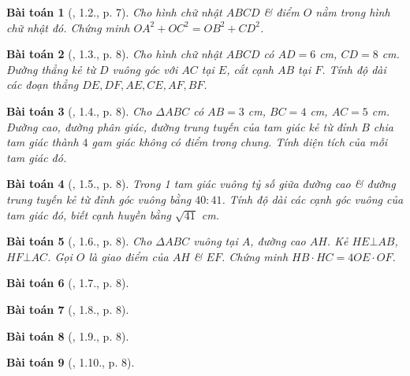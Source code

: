 \documentclass{article}
\newtheorem{baitoan}{Bài toán}
\begin{document}
\begin{baitoan}[\cite{TLCT_THCS_Toan_9_hinh_hoc}, 1.2., p. 7]
	Cho hình chữ nhật $ABCD$ \& điểm $O$ nằm trong hình chữ nhật đó. Chứng minh $OA^2 + OC^2 = OB^2 + CD^2$.
\end{baitoan}

\begin{baitoan}[\cite{TLCT_THCS_Toan_9_hinh_hoc}, 1.3., p. 8]
	Cho hình chữ nhật $ABCD$ có $AD = 6$ \emph{cm}, $CD = 8$ \emph{cm}. Đường thẳng kẻ từ $D$ vuông góc với $AC$ tại $E$, cắt cạnh $AB$ tại $F$. Tính độ dài các đoạn thẳng $DE,DF,AE,CE,AF,BF$.
\end{baitoan}

\begin{baitoan}[\cite{TLCT_THCS_Toan_9_hinh_hoc}, 1.4., p. 8]
	Cho $\Delta ABC$ có $AB = 3$  \emph{cm}, $BC = 4$ \emph{cm}, $AC = 5$ \emph{cm}. Đường cao, đường phân giác, đường trung tuyến của tam giác kẻ từ đỉnh $B$ chia tam giác thành $4$ gam giác không có điểm trong chung. Tính diện tích của mỗi tam giác đó.
\end{baitoan}

\begin{baitoan}[\cite{TLCT_THCS_Toan_9_hinh_hoc}, 1.5., p. 8]
	Trong 1 tam giác vuông tỷ số giữa đường cao \& đường trung tuyến kẻ từ đỉnh góc vuông bằng $40:41$. Tính độ dài các cạnh góc vuông của tam giác đó, biết cạnh huyền bằng $\sqrt{41}$ \emph{cm}.
\end{baitoan}

\begin{baitoan}[\cite{TLCT_THCS_Toan_9_hinh_hoc}, 1.6., p. 8]
	Cho $\Delta ABC$ vuông tại $A$, đường cao $AH$. Kẻ $HE\bot AB$, $HF\bot AC$. Gọi $O$ là giao điểm của $AH$ \& $EF$. Chứng minh $HB\cdot HC = 4OE\cdot OF$.
\end{baitoan}

\begin{baitoan}[\cite{TLCT_THCS_Toan_9_hinh_hoc}, 1.7., p. 8]
	
\end{baitoan}

\begin{baitoan}[\cite{TLCT_THCS_Toan_9_hinh_hoc}, 1.8., p. 8]
	
\end{baitoan}

\begin{baitoan}[\cite{TLCT_THCS_Toan_9_hinh_hoc}, 1.9., p. 8]
	
\end{baitoan}

\begin{baitoan}[\cite{TLCT_THCS_Toan_9_hinh_hoc}, 1.10., p. 8]
	
\end{baitoan}
\end{document}
